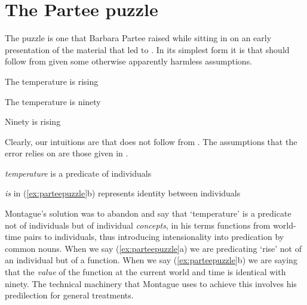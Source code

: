 \section{The Partee puzzle}

The puzzle is one that Barbara Partee raised while
sitting in on an early presentation of the material that led to
\cite{Montague1973}.  In its simplest form it is that 
should follow from  given some otherwise apparently
harmless assumptions.
\begin{ex} 
\begin{subex} 
 
\item The temperature is rising 
 
\item The temperature is ninety

\item Ninety is rising 
 
\end{subex} 
\label{ex:parteepuzzle}   
\end{ex}
Clearly, our intuitions are that  does not follow from
. The assumptions that the error relies on are those given
in \nexteg{}.
\begin{ex} 
\begin{subex} 
 
\item  \textit{temperature} is a
predicate of individuals
 
\item \textit{is} in (\ref{ex:parteepuzzle}b) represents identity
between individuals
 
\end{subex} 
   
\end{ex}
Montague's solution was to abandon  and say that
`temperature' is a predicate not of individuals but of
individual \textit{concepts}, in his terms functions from world-time
pairs to individuals, thus introducing intensionality into predication
by common nouns.  When we say (\ref{ex:parteepuzzle}a) we are
predicating `rise' not of an individual but of a function.
When we say (\ref{ex:parteepuzzle}b) we are saying that the
\textit{value} of the function at the current world and time is
identical with ninety.  The technical machinery that Montague uses to
achieve this involves his predilection for general treatments.  
